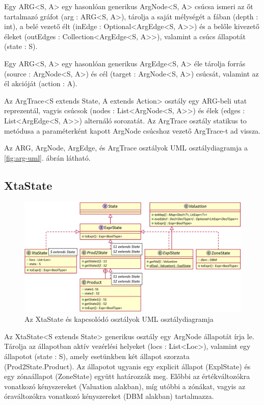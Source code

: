Egy \textsf{ARG<S, A>} egy hasonlóan generikus \textsf{ArgNode<S, A>} csúcsa ismeri az őt tartalmazó gráfot (\textsf{arg : ARG<S, A>}), tárolja a saját mélységét a fában (\textsf{depth : int}), a belé vezető élt (\textsf{inEdge : Optional<ArgEdge<S, A>{}>}) és a belőle kivezető éleket (\textsf{outEdges : Collection<ArgEdge<S, A>{}>}), valamint a csúcs állapotát (\textsf{state : S}).

Egy \textsf{ARG<S, A>} egy hasonlóan generikus \textsf{ArgEdge<S, A>} éle tárolja forrás (\textsf{source : ArgNode<S, A>}) és cél (\textsf{target : ArgNode<S, A>}) csúcsát, valamint az él akcióját (\textsf{action : A}).

Az \textsf{ArgTrace<S extends State, A extends Action>} osztály egy \textsf{ARG}-beli utat reprezentál, vagyis csúcsok (\textsf{nodes : List<ArgNode<S, A>{}>}) és élek (\textsf{edges : List<ArgEdge<S, A>{}>}) alternáló sorozatát. Az \textsf{ArgTrace} osztály statikus \textsf{to} metódusa a paraméterként kapott \textsf{ArgNode} csúcshoz vezető \textsf{ArgTrace}-t ad vissza.

Az \textsf{ARG}, \textsf{ArgNode}, \textsf{ArgEdge}, és \textsf{ArgTrace} osztályok UML osztálydiagramja a \ref{fig:arg-uml}. ábrán látható.

\subsection{XtaState}

\begin{figure}%
    \centering
    \includegraphics[width=\textwidth, keepaspectratio]{src/figures/xtastate-uml.png}
    \caption{Az \textsf{XtaState} és kapcsolódó osztályok UML osztálydiagramja}
    \label{fig:xtastate-uml}
\end{figure}

Az \textsf{XtaState<S extends State>} generikus osztály egy \textsf{ArgNode} állapotát írja le. Tárolja az állapotban aktív vezérlési helyeket (\textsf{locs : List<Loc>}), valamint egy állapotot (\textsf{state : S}), amely esetünkben két állapot szorzata (\textsf{Prod2State.Product}). Az állapotot ugyanis egy explicit állapot (\textsf{ExplState}) és egy zónaállapot (\textsf{ZoneState}) együtt határozzák meg. Előbbi az értékváltozókra vonatkozó kényszereket (\textsf{Valuation} alakban), míg utóbbi a zónákat, vagyis az óraváltozókra vonatkozó kényszereket (\textsf{DBM} alakban) tartalmazza.

